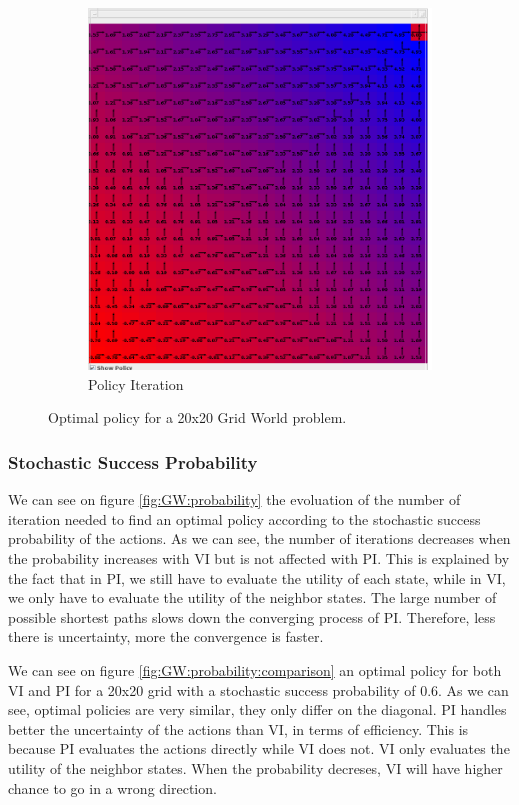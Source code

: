 \documentclass[10pt, twocolumn]{article}
\begin{document}
\begin{figure}[]
\begin{subfigure}[t]{0.24\textwidth}
						\includegraphics[width=\textwidth]{../graphics/GridWorld_20_pi_size.png}
						\caption{Policy Iteration}
						\label{fig:GW:size:PI}
					\end{subfigure}
					\caption{Optimal policy for a 20x20 Grid World problem.}
					\label{fig:GW:size:comparison}
				\end{figure}
			\subsubsection*{Stochastic Success Probability}
				We can see on figure \ref{fig:GW:probability} the evoluation of the number of iteration needed to find an optimal policy according to the stochastic success probability of the actions. As we can see, the number of iterations decreases when the probability increases with VI but is not affected with PI. This is explained by the fact that in PI, we still have to evaluate the utility of each state, while in VI, we only have to evaluate the utility of the neighbor states. The large number of possible shortest paths slows down the converging process of PI. Therefore, less there is uncertainty, more the convergence is faster.

				We can see on figure \ref{fig:GW:probability:comparison} an optimal policy for both VI and PI for a 20x20 grid with a stochastic success probability of 0.6. As we can see, optimal policies are very similar, they only differ on the diagonal. PI handles better the uncertainty of the actions than VI, in terms of efficiency. This is because PI evaluates the actions directly while VI does not. VI only evaluates the utility of the neighbor states. When the probability decreses, VI will have higher chance to go in a wrong direction.
\end{document}
